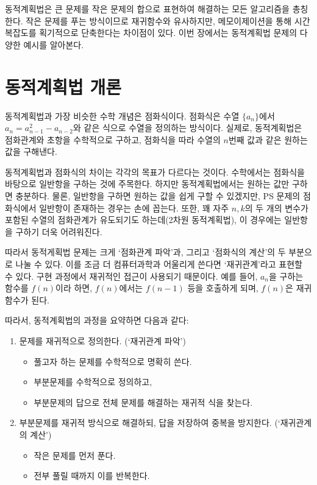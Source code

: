 동적계획법은 큰 문제를 작은 문제의 합으로 표현하여 해결하는 모든 알고리즘을 총칭한다. 작은 문제를 푸는 방식이므로 재귀함수와 유사하지만, 메모이제이션을 통해 시간복잡도를 획기적으로 단축한다는 차이점이 있다. 이번 장에서는 동적계획법 문제의 다양한 예시를 알아본다.

\section{동적계획법 개론}

동적계획법과 가장 비슷한 수학 개념은 점화식이다. 점화식은 수열 $\{a_n\}$에서 $a_n = a_{n-1}^2 - a_{n-2}$와 같은 식으로 수열을 정의하는 방식이다. 실제로, 동적계획법은 점화관계와 초항을 수학적으로 구하고, 점화식을 따라 수열의 $n$번째 값과 같은 원하는 값을 구해낸다.

동적계획법과 점화식의 차이는 각각의 목표가 다르다는 것이다. 수학에서는 점화식을 바탕으로 일반항을 구하는 것에 주목한다. 하지만 동적계획법에서는 원하는 값만 구하면 충분하다. 물론, 일반항을 구하면 원하는 값을 쉽게 구할 수 있겠지만, PS 문제의 점화식에서 일반항이 존재하는 경우는 손에 꼽는다. 또한, 꽤 자주 $n, k$의 두 개의 변수가 포함된 수열의 점화관계가 유도되기도 하는데(2차원 동적계획법), 이 경우에는 일반항을 구하기 더욱 어려워진다.

따라서 동적게획법 문제는 크게 `점화관계 파악'과, 그리고 `점화식의 계산'의 두 부분으로 나눌 수 있다. 이를 조금 더 컴퓨터과학과 어울리게 쓴다면 `재귀관계'라고 표현할 수 있다. 구현 과정에서 재귀적인 접근이 사용되기 때문이다. 예를 들어, $a_n$을 구하는 함수를 $f(n)$이라 하면, $f(n)$에서는 $f(n-1)$ 등을 호출하게 되며, $f(n)$은 재귀함수가 된다.

따라서, 동적계획법의 과정을 요약하면 다음과 같다:
\begin{enumerate}
    \item 문제를 재귀적으로 정의한다. (`재귀관계 파악')
    \begin{itemize}
        \item 풀고자 하는 문제를 수학적으로 명확히 쓴다.
        \item 부분문제를 수학적으로 정의하고,
        \item 부분문제의 답으로 전체 문제를 해결하는 재귀적 식을 찾는다.
    \end{itemize}
    \item 부분문제를 재귀적 방식으로 해결하되, 답을 저장하여 중복을 방지한다. (`재귀관계의 계산')
    \begin{itemize}
        \item 작은 문제를 먼저 푼다.
        \item 전부 풀릴 때까지 이를 반복한다.
    \end{itemize}
\end{enumerate}

